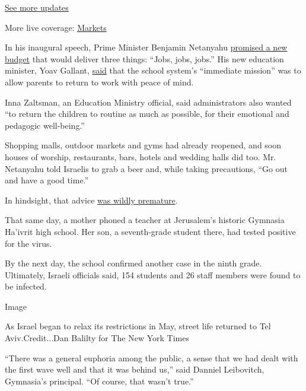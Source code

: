 \href{https://www.nytimes3xbfgragh.onion/2020/08/04/world/coronavirus-cases.html?action=click\&pgtype=Article\&state=default\&region=MAIN_CONTENT_1\&context=storylines_live_updates}{See
more updates}

More live coverage:
\href{https://www.nytimes3xbfgragh.onion/live/2020/08/04/business/stock-market-today-coronavirus?action=click\&pgtype=Article\&state=default\&region=MAIN_CONTENT_1\&context=storylines_live_updates}{Markets}

In his inaugural speech, Prime Minister Benjamin Netanyahu
\href{https://www.nytimes3xbfgragh.onion/2020/05/17/world/middleeast/israel-netanyahu-gantz-government.html}{promised
a new budget} that would deliver three things: ``Jobs, jobs, jobs.'' His
new education minister, Yoav Gallant,
\href{https://www.facebookcorewwwi.onion/YoavGallant/photos/a.621695154643450/2149523848527232/?type=3\&theater}{said}
that the school system's ``immediate mission'' was to allow parents to
return to work with peace of mind.

Inna Zaltsman, an Education Ministry official, said administrators also
wanted ``to return the children to routine as much as possible, for
their emotional and pedagogic well-being.''

Shopping malls, outdoor markets and gyms had already reopened, and soon
houses of worship, restaurants, bars, hotels and wedding halls did too.
Mr. Netanyahu told Israelis to grab a beer and, while taking
precautions, ``Go out and have a good time.''

In hindsight, that advice
\href{https://www.nytimes3xbfgragh.onion/2020/07/24/world/middleeast/israel-virus-protests-netanyahu.html?searchResultPosition=2}{was
wildly premature}.

That same day, a mother phoned a teacher at Jerusalem's historic
Gymnasia Ha'ivrit high school. Her son, a seventh-grade student there,
had tested positive for the virus.

By the next day, the school confirmed another case in the ninth grade.
Ultimately, Israeli officials said, 154 students and 26 staff members
were found to be infected.

Image

As Israel began to relax its restrictions in May, street life returned
to Tel Aviv.Credit...Dan Balilty for The New York Times

``There was a general euphoria among the public, a sense that we had
dealt with the first wave well and that it was behind us,'' said Danniel
Leibovitch, Gymnasia's principal. ``Of course, that wasn't true.''

